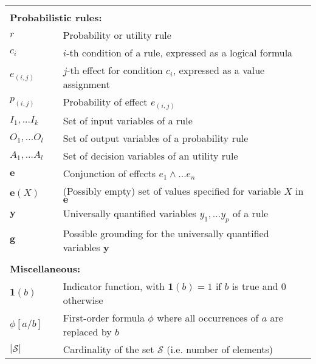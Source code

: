 \begin{longtable}{lp{5mm}p{11cm}}
&&  \vspace{3mm} \\
\multicolumn{3}{l}{\textbf{Probabilistic rules:}} \vspace{2mm} \\
$r$ && Probability or utility rule \\
$c_i$ && $i$-th condition of a rule, expressed as a logical formula \\
$e_{(i,j)}$ && $j$-th effect for condition $c_i$, expressed as a value assignment \\
$p_{(i,j)}$ && Probability of effect $e_{(i,j)}$ \\
$I_1,...I_{k}$  && Set of input variables of a rule\\
$O_1,...O_{l}$ && Set of output variables of a probability rule \\
$A_1,...A_{l}$ && Set of decision variables of an utility rule \\
$\mathbf{e}$ && Conjunction of effects $e_1 \land ... e_n$ \\
$\mathbf{e}(X)$ && (Possibly empty) set of values specified for variable $X$ in $\mathbf{e}$ \\
$\mathbf{y}$ && Universally quantified variables $y_1,... y_p$ of a rule  \\
$\mathbf{g}$ && Possible grounding for the universally quantified variables $\mathbf{y}$ \\
&&  \vspace{3mm} \\
\multicolumn{3}{l}{\textbf{Miscellaneous:}} \vspace{2mm} \\
$\mathbf{1}(b)$ && Indicator function, with $\mathbf{1}(b) = 1$ if $b$ is true and 0 otherwise \\
$\phi[a / b]$ && First-order formula $\phi$ where all occurrences of $a$ are replaced by $b$ \\
$|\mathcal{S}|$ && Cardinality of the set $\mathcal{S}$ (i.e. number of elements) 
\end{longtable}

